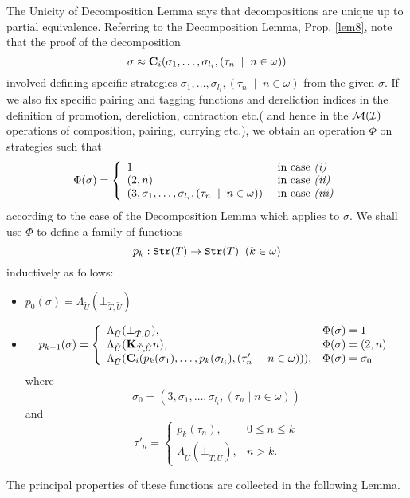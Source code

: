 \documentclass[11pt]{article}
\begin{document}
The Unicity of Decomposition Lemma says that decompositions are unique up
to partial equivalence. Referring to the Decomposition Lemma,
Prop. \ref{lem8}, note that the proof of the decomposition
$$\sigma\approx {\bf C}_i(\sigma_1,\dots,\sigma_{l_i},(\tau_n\;\mid \;
n\in\omega))$$
involved defining specific strategies
$\sigma_1,\dots,\sigma_{l_i},(\tau_n\;\mid \; n\in\omega)$ from the given
$\sigma$. If we also fix specific pairing and tagging functions and
dereliction indices in the definition of promotion,
dereliction, contraction etc.( and hence in the $\cal M(I)$
operations of composition, pairing, currying etc.), we obtain an
operation $\Phi$ on strategies such that
\[ \Phi(\sigma)= \left\{ \begin{array}{ll}
            1 & \mbox{ in case {\it (i)} } \\
            (2,n) & \mbox{ in case {\it (ii)} } \\
           (3,\sigma_1,\dots,\sigma_{l_i},(\tau_n\;\mid \; n\in\omega))
           &\mbox{ in case {\it (iii)}}
        \end{array}
\right. \]
according to the case of the Decomposition Lemma which applies to
$\sigma$. We shall use $\Phi$ to define a family of
functions
$$p_k:{\tt Str}(T)\rightarrow {\tt Str}(T) \;\; (k\in\omega)$$
inductively as follows:
\begin{itemize}
\item $p_0(\sigma)=\Lambda_{\tilde{U}}(\bot_{\tilde{T},\tilde{U}})$
\item \[ p_{k+1}(\sigma)= \left\{ \begin{array}{ll}
\Lambda_{\tilde{U}}(\bot_{\tilde{T},\tilde{U}}), &
\Phi(\sigma)=1 \\

\Lambda_{\tilde{U}}({\bf K}_{\tilde{T},\tilde{U}}n) , &
\Phi(\sigma)=(2,n) \\

\Lambda_{\tilde{U}}({\bf C}_i(p_k(\sigma_1),\dots,p_k(\sigma_{l_i}),(\tau'_n\;\mid \;
n\in\omega))), & \Phi(\sigma) =\sigma_0

\end{array}
\right. \]
where
$$\sigma_0=
(3,\sigma_1,\dots,\sigma_{l_i},(\tau_n\mid n\in\omega) ) $$
and
\[ \tau'_n= \left\{ \begin{array}{ll}
p_k(\tau_n), & 0\leq n\leq k \\
\Lambda_{\tilde{U}}(\bot_{\tilde{T},\tilde{U}}), & n > k .
\end{array}
\right. \]

\end{itemize}
The principal properties of these functions are collected in the
following Lemma.
\end{document}
